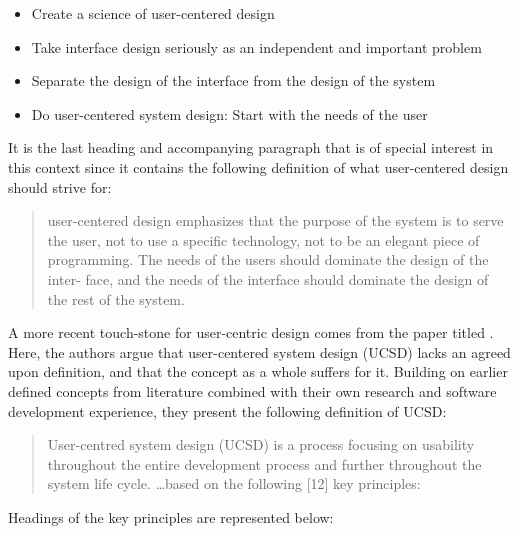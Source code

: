 \begin{itemize}
 \item{Create a science of user-centered design}
 \item{Take interface design seriously as an independent and important problem}
 \item{Separate the design of the interface from the design of the system}
 \item{Do user-centered system design: Start with the needs of the user}
\end{itemize}

It is the last heading and accompanying paragraph that is of special interest
in this context since it contains the following definition of what
user-centered design should strive for\cite[p. 59-61]{citeUserCenteredNorman}:

\begin{quote}
  user-centered design emphasizes that
  the purpose of the system is to serve the user, not to use a
  specific technology, not to be an elegant piece of programming.
  The needs of the users should dominate the design of the inter-
  face, and the needs of the interface should dominate the design
  of the rest of the system.
\end{quote}

A more recent touch-stone for user-centric design comes from the
\citeyear{citeKeyPrinciplesUserCentric} paper titled
\cite{citeKeyPrinciplesUserCentric}.
Here, the authors argue that user-centered system design (UCSD) lacks an
agreed upon definition, and that the concept as a whole suffers for it.
Building on earlier defined concepts from literature combined with their own
research and software development experience, they present the following
definition of UCSD\cite[p. 401]{citeKeyPrinciplesUserCentric}:

\begin{quote}
  User-centred system design (UCSD) is a process focusing on usability
  throughout the entire development process and further throughout the system
  life cycle. \ldots based on the following [12] key principles:
\end{quote}

Headings
of the key principles\cite{citeKeyPrinciplesUserCentric} are represented below:

